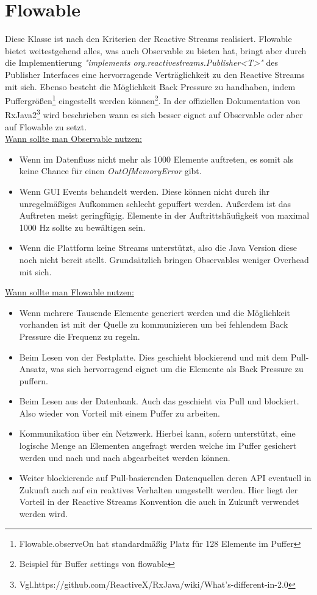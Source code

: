 \section{Flowable}
Diese Klasse ist nach den Kriterien der Reactive Streams realisiert. Flowable bietet weitestgehend alles, was auch Observable zu bieten hat, bringt aber durch die Implementierung \textit{"implements org.reactivestreams.Publisher<T>"} des Publisher Interfaces eine  hervorragende Verträglichkeit zu den Reactive Streams mit sich. Ebenso besteht die Möglichkeit Back Pressure zu handhaben, indem Puffergrößen\footnote{Flowable.observeOn hat standardmäßig Platz für 128 Elemente im Puffer} eingestellt werden können\footnote{Beispiel für Buffer settings von flowable}. In der offiziellen Dokumentation von RxJava2\footnote{Vgl.https://github.com/ReactiveX/RxJava/wiki/What's-different-in-2.0} wird beschrieben wann es sich besser eignet auf Observable oder aber auf Flowable zu setzt. \\ \underline{Wann sollte man Observable nutzen:}
\begin{itemize}
	\item Wenn im Datenfluss nicht mehr als 1000 Elemente auftreten, es somit als keine Chance für einen \textit{OutOfMemoryError} gibt.
	\item Wenn GUI Events behandelt werden. Diese können nicht durch ihr unregelmäßiges Aufkommen schlecht gepuffert werden. Außerdem ist das Auftreten meist geringfügig. Elemente in der Auftrittshäufigkeit von maximal 1000 Hz sollte zu bewältigen sein.
	\item Wenn die Plattform keine Streams unterstützt, also die Java Version diese noch nicht bereit stellt. Grundsätzlich bringen Observables weniger Overhead mit sich.
\end{itemize}
\underline{Wann sollte man Flowable nutzen:}
\begin{itemize}
	\item Wenn mehrere Tausende Elemente generiert werden und die Möglichkeit vorhanden ist mit der Quelle zu kommunizieren um bei fehlendem Back Pressure die Frequenz zu regeln.
	\item Beim Lesen von der Festplatte. Dies geschieht blockierend und mit dem Pull-Ansatz, was sich hervorragend eignet um die Elemente als Back Pressure zu puffern.
	\item Beim Lesen aus der Datenbank. Auch das geschieht via Pull und blockiert. Also wieder von Vorteil mit einem Puffer zu arbeiten.
	\item Kommunikation über ein Netzwerk. Hierbei kann, sofern unterstützt, eine logische Menge an Elementen angefragt werden welche im Puffer gesichert werden und nach und nach abgearbeitet werden können.
	\item Weiter blockierende auf Pull-basierenden Datenquellen deren API eventuell in Zukunft auch auf ein reaktives Verhalten umgestellt werden. Hier liegt der Vorteil in der Reactive Streams Konvention die auch in Zukunft verwendet werden wird.
\end{itemize}
